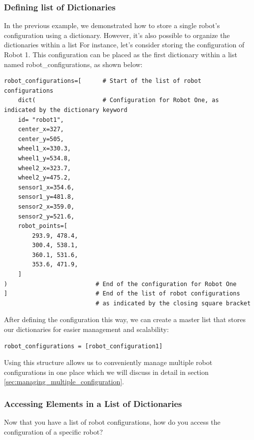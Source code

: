 \subsubsection{Defining list of Dictionaries}
In the previous example, we demonstrated how to store a single robot’s configuration using a
dictionary. However, it’s also possible to organize the dictionaries within a list
For instance, let’s consider storing the configuration of Robot 1. This configuration can be placed
as the first dictionary within a list named robot\_configurations, as shown below:



\begin{verbatim}
robot_configurations=[      # Start of the list of robot configurations
    dict(                   # Configuration for Robot One, as indicated by the dictionary keyword
    id= "robot1",
    center_x=327,
    center_y=505,
    wheel1_x=330.3,
    wheel1_y=534.8,
    wheel2_x=323.7,
    wheel2_y=475.2,
    sensor1_x=354.6,
    sensor1_y=481.8,
    sensor2_x=359.0,
    sensor2_y=521.6,
    robot_points=[
        293.9, 478.4,
        300.4, 538.1,
        360.1, 531.6,
        353.6, 471.9,
    ]
)                         # End of the configuration for Robot One
]                         # End of the list of robot configurations 
                          # as indicated by the closing square bracket
\end{verbatim}



After defining the configuration this way, we can create a master list that stores our dictionaries for easier management and scalability:

\begin{verbatim}
robot_configurations = [robot_configuration1]
\end{verbatim}

Using this structure allows us to conveniently manage multiple robot configurations in one place which we will discuss in detail in section \ref{sec:managing_multiple_configuration}.



\subsubsection{Accessing Elements in a List of Dictionaries}

Now that you have a list of robot configurations, how do you access the configuration of a specific robot?

